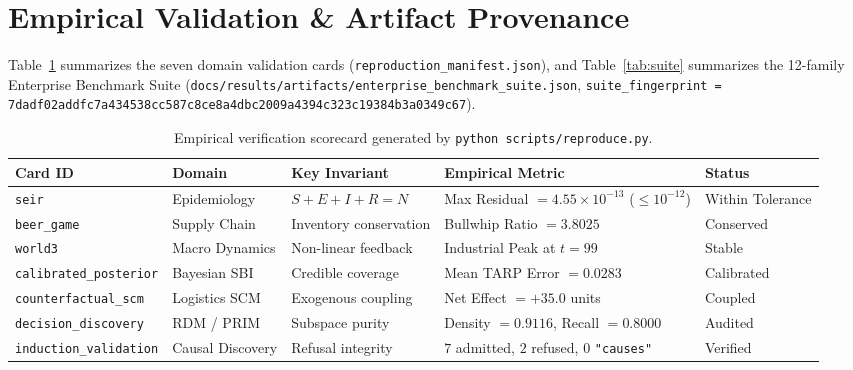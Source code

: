 \documentclass[11pt,a4paper]{article}
\begin{document}
\section{Empirical Validation \& Artifact Provenance}
Table~\ref{tab:cards} summarizes the seven domain validation cards (\texttt{reproduction\_manifest.json}), and Table~\ref{tab:suite} summarizes the 12-family Enterprise Benchmark Suite (\texttt{docs/results/artifacts/enterprise\_benchmark\_suite.json}, \texttt{suite\_fingerprint = 7dadf02addfc7a434538cc587c8ce8a4dbc2009a4394c323c19384b3a0349c67}).

\begin{table}[h]
\centering
\small
\begin{tabular}{lllll}
\toprule
\textbf{Card ID} & \textbf{Domain} & \textbf{Key Invariant} & \textbf{Empirical Metric} & \textbf{Status} \\
\midrule
\texttt{seir} & Epidemiology & $S+E+I+R = N$ & Max Residual $= 4.55 \times 10^{-13}$ ($\le 10^{-12}$) & Within Tolerance \\
\texttt{beer\_game} & Supply Chain & Inventory conservation & Bullwhip Ratio $= 3.8025$ & Conserved \\
\texttt{world3} & Macro Dynamics & Non-linear feedback & Industrial Peak at $t=99$ & Stable \\
\texttt{calibrated\_posterior} & Bayesian SBI & Credible coverage & Mean TARP Error $= 0.0283$ & Calibrated \\
\texttt{counterfactual\_scm} & Logistics SCM & Exogenous coupling & Net Effect $= +35.0$ units & Coupled \\
\texttt{decision\_discovery} & RDM / PRIM & Subspace purity & Density $= 0.9116$, Recall $= 0.8000$ & Audited \\
\texttt{induction\_validation} & Causal Discovery & Refusal integrity & $7$ admitted, $2$ refused, $0$ \texttt{"causes"} & Verified \\
\bottomrule
\end{tabular}
\caption{Empirical verification scorecard generated by \texttt{python scripts/reproduce.py}.}
\label{tab:cards}
\end{table}
\end{document}
